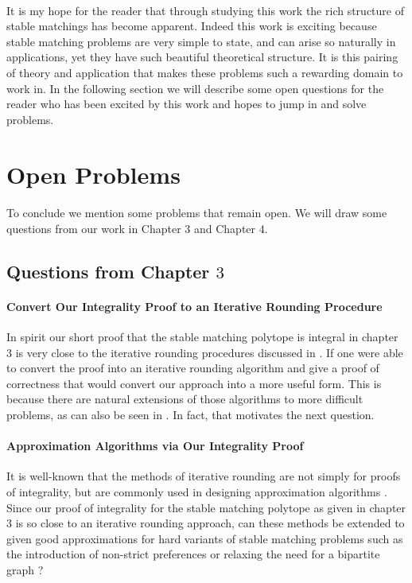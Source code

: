 \paragraph{}
It is my hope for the reader that through studying this work the rich structure of stable matchings has become apparent. Indeed this work is exciting because stable matching problems are very simple to state, and can arise so naturally in applications, yet they have such beautiful theoretical structure. It is this pairing of theory and application that makes these problems such a rewarding domain to work in. In the following section we will describe some open questions for the reader who has been excited by this work and hopes to jump in and solve problems. 

\section{Open Problems}

\paragraph{}
To conclude we mention some problems that remain open. We will draw some questions from our work in Chapter $3$ and Chapter $4$.
\subsection{Questions from Chapter $3$}

\paragraph{Convert Our Integrality Proof to an Iterative Rounding Procedure}
In spirit our short proof that the stable matching polytope is integral in chapter 3 is very close to the iterative rounding procedures discussed in \cite{lau2011iterative}. If one were able to convert the proof into an iterative rounding algorithm and give a proof of correctness that would convert our approach into a more useful form. This is because there are natural extensions of those algorithms to more difficult problems, as can also be seen in \cite{lau2011iterative}. In fact, that motivates the next question.

\paragraph{Approximation Algorithms via Our Integrality Proof}
It is well-known that the methods of iterative rounding are not simply for proofs of integrality, but are commonly used in designing approximation algorithms \cite{lau2011iterative}. Since our proof of integrality for the stable matching polytope as given in chapter $3$ is so close to an iterative rounding approach, can these methods be extended to given good approximations for hard variants of stable matching problems such as the introduction of non-strict preferences or relaxing the need for a bipartite graph \cite{iwama2008survey}?


